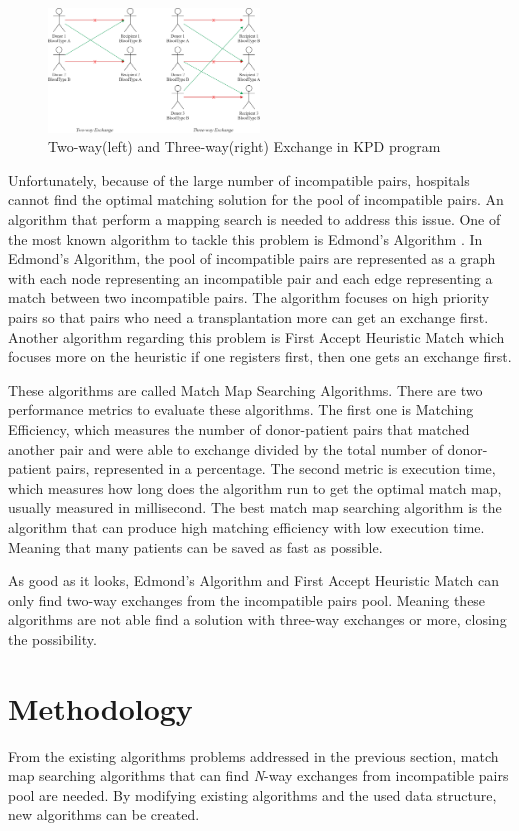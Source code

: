 \documentclass[conference]{IEEEtran}
\begin{document}
\begin{figure}[h]
\includegraphics[width=0.5\textwidth]{images/kidney-exchange.png}
\caption{Two-way(left) and Three-way(right) Exchange in KPD program}
\end{figure}

Unfortunately, because of the large number of incompatible pairs, hospitals cannot find the optimal
matching solution for the pool of incompatible pairs. An algorithm that perform a mapping search is needed
to address this issue. One of the most known algorithm to tackle this problem is Edmond's Algorithm \cite{raja}.
In Edmond's Algorithm, the pool of incompatible pairs are represented as a graph with each node representing
an incompatible pair and each edge representing a match between two incompatible pairs. The algorithm focuses on
high priority pairs so that pairs who need a transplantation more can get an exchange first.
Another algorithm regarding this problem is First Accept Heuristic Match \cite{raja} which focuses more on the
heuristic if one registers first, then one gets an exchange first.

These algorithms are called Match Map Searching Algorithms. There are two performance metrics to evaluate these
algorithms. The first one is Matching Efficiency, which measures the number of donor-patient pairs that matched
another pair and were able to exchange divided by the total number of donor-patient pairs, represented in a percentage.
The second metric is execution time, which measures how long does the algorithm run to get the optimal match map,
usually measured in millisecond. The best match map searching algorithm is the algorithm that can produce high matching
efficiency with low execution time. Meaning that many patients can be saved as fast as possible.

As good as it looks, Edmond's Algorithm and First Accept Heuristic Match can only find two-way exchanges from the
incompatible pairs pool. Meaning these algorithms are not able find a solution with three-way exchanges or more,
closing the possibility.

\section{Methodology}
From the existing algorithms problems addressed in the previous section, match map searching algorithms that can find
\textit{N}-way exchanges from incompatible pairs pool are needed. By modifying existing algorithms and the used data
structure, new algorithms can be created.
\end{document}

